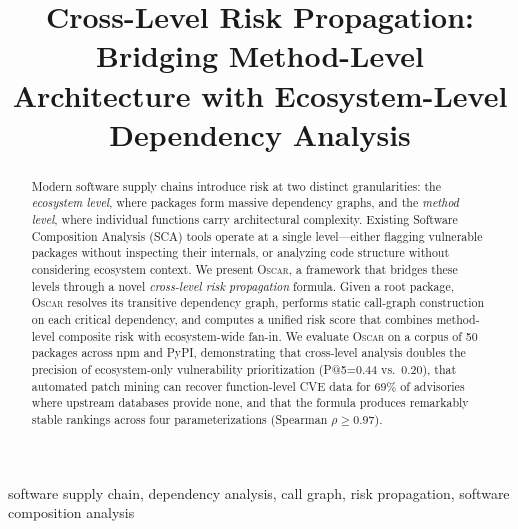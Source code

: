 \documentclass[conference]{IEEEtran}
\begin{document}
\title{Cross-Level Risk Propagation: Bridging Method-Level\\Architecture with Ecosystem-Level Dependency Analysis}

\author{
    \and
}

\maketitle

\begin{abstract}
Modern software supply chains introduce risk at two distinct granularities: the \emph{ecosystem level}, where packages form massive dependency graphs, and the \emph{method level}, where individual functions carry architectural complexity.
Existing Software Composition Analysis (SCA) tools operate at a single level—either flagging vulnerable packages without inspecting their internals, or analyzing code structure without considering ecosystem context.
We present \textsc{Oscar}, a framework that bridges these levels through a novel \emph{cross-level risk propagation} formula.
Given a root package, \textsc{Oscar} resolves its transitive dependency graph, performs static call-graph construction on each critical dependency, and computes a unified risk score that combines method-level composite risk with ecosystem-wide fan-in.
We evaluate \textsc{Oscar} on a corpus of 50 packages across npm and PyPI, demonstrating that cross-level analysis doubles the precision of ecosystem-only vulnerability prioritization (P@5=0.44 vs.\ 0.20), that automated patch mining can recover function-level CVE data for 69\% of advisories where upstream databases provide none, and that the formula produces remarkably stable rankings across four parameterizations (Spearman $\rho \geq 0.97$).
\end{abstract}

\begin{IEEEkeywords}
software supply chain, dependency analysis, call graph, risk propagation, software composition analysis
\end{IEEEkeywords}
\end{document}
